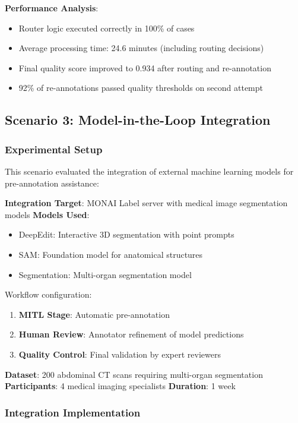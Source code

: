 \textbf{Performance Analysis}:
\begin{itemize}
    \item Router logic executed correctly in 100\% of cases
    \item Average processing time: 24.6 minutes (including routing decisions)
    \item Final quality score improved to 0.934 after routing and re-annotation
    \item 92\% of re-annotations passed quality thresholds on second attempt
\end{itemize}

\subsection{Scenario 3: Model-in-the-Loop Integration}
\label{subsec:scenario-mitl}

\subsubsection{Experimental Setup}

This scenario evaluated the integration of external machine learning models for pre-annotation assistance:

\textbf{Integration Target}: MONAI Label server with medical image segmentation models
\textbf{Models Used}:
\begin{itemize}
    \item DeepEdit: Interactive 3D segmentation with point prompts
    \item SAM: Foundation model for anatomical structures
    \item Segmentation: Multi-organ segmentation model
\end{itemize}

Workflow configuration:
\begin{enumerate}
    \item \textbf{MITL Stage}: Automatic pre-annotation
    \item \textbf{Human Review}: Annotator refinement of model predictions
    \item \textbf{Quality Control}: Final validation by expert reviewers
\end{enumerate}

\textbf{Dataset}: 200 abdominal CT scans requiring multi-organ segmentation
\textbf{Participants}: 4 medical imaging specialists
\textbf{Duration}: 1 week

\subsubsection{Integration Implementation}

